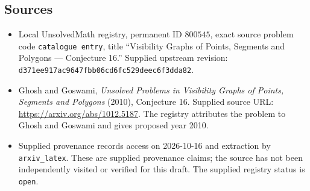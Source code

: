\documentclass[11pt]{article}
\begin{document}
\subsection{Sources}
\begin{itemize}
\item Local UnsolvedMath registry, permanent ID \(800545\), exact source problem code \texttt{catalogue entry}, title ``Visibility Graphs of Points, Segments and Polygons --- Conjecture 16.'' Supplied upstream revision: \texttt{d371ee917ac9647fbb06cd6fc529deec6f3dda82}.
\item Ghosh and Goswami, \emph{Unsolved Problems in Visibility Graphs of Points, Segments and Polygons} (2010), Conjecture 16. Supplied source URL: \url{https://arxiv.org/abs/1012.5187}. The registry attributes the problem to Ghosh and Goswami and gives proposed year 2010.
\item Supplied provenance records access on 2026-10-16 and extraction by \texttt{arxiv\_latex}. These are supplied provenance claims; the source has not been independently visited or verified for this draft. The supplied registry status is \texttt{open}.
\end{itemize}
\end{document}
